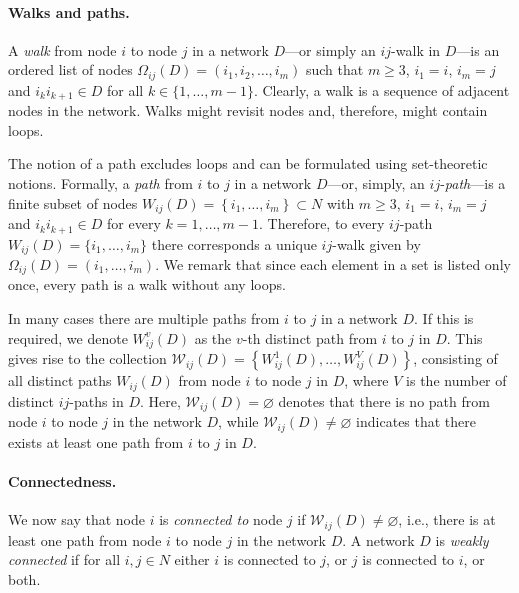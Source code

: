 \paragraph{Walks and paths.}

A \emph{walk} from node $i$ to node $j$ in a network $D$---or simply an $ij$-walk in $D$---is an ordered list of nodes $\Omega_{ij} (D) = \left( i_1, i_2 , \ldots ,i_m \right)$ such that $m \geqslant 3$, $i_1 =i$, $i_m =j$ and $i_k i_{k+1} \in D$ for all $k \in \{ 1, \ldots ,m-1 \}$. Clearly, a walk is a sequence of adjacent nodes in the network. Walks might revisit nodes and, therefore, might contain loops.

The notion of a path excludes loops and can be formulated using set-theoretic notions. Formally, a \textit{path} from $i$ to $j$ in a network $D$---or, simply, an $ij$-\emph{path}---is a finite subset of nodes $W_{ij} (D) = \left\{ i_{1}, \ldots ,i_{m} \right\} \subset N$ with $m \geqslant 3$, $i_1 =i$, $i_m =j$ and $i_{k}i_{k+1} \in D$ for every $k=1, \ldots ,m-1$. Therefore, to every $ij$-path $W_{ij} (D) = \{ i_1, \ldots ,i_m \}$ there corresponds a unique $ij$-walk given by $\Omega_{ij} (D) = ( i_1, \ldots ,i_m )$. We remark that since each element in a set is listed only once, every path is a walk without any loops.

In many cases there are multiple paths from $i$ to $j$ in a network $D$. If this is required, we denote $W_{ij}^{v}(D)$ as the $v$-th distinct path from $i$ to $j$ in $D$. This gives rise to the collection $\mathcal{W}_{ij}(D)= \left\{ W_{ij}^{1}(D), \ldots ,W_{ij}^{V}(D) \right\}$, consisting of all distinct paths $W_{ij} (D)$ from node $i$ to node $j$ in $D$, where $V$ is the number of distinct $ij$-paths in $D$. Here, $\mathcal{W}_{ij}(D)= \varnothing$ denotes that there is no path from node $i$ to node $j$ in the network $D$, while $\mathcal{W}_{ij}(D) \neq \varnothing$ indicates that there exists at least one path from $i$ to $j$ in $D$.

\paragraph{Connectedness.}

We now say that node $i$ is \textit{connected to} node $j$ if $\mathcal{W}_{ij}(D) \neq \varnothing$, i.e., there is at least one path from node $i$ to node $j$ in the network $D$. A network $D$ is \emph{weakly connected} if for all $i,j \in N$ either $i$ is connected to $j$, or $j$ is connected to $i$, or both.

